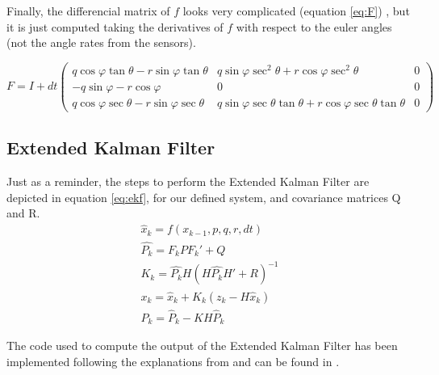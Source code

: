 Finally, the differencial matrix of $f$ looks very complicated (equation \ref{eq:F}) , but it is just computed taking the derivatives of $f$ with respect to the euler angles (not the angle rates from the sensors).

\begin{equation}
    \label{eq:F}
   F = I + dt
   \begin{pmatrix}
       q \cos\varphi \tan\theta - r \sin\varphi \tan \theta &
       q \sin \varphi \sec^2 \theta + r \cos \varphi \sec^2 \theta &
       0 \\
       -q \sin \varphi - r \cos \varphi
       & 0 & 0 \\
       q \cos \varphi \sec \theta - r \sin \varphi \sec \theta &
       q \sin \varphi \sec \theta \tan \theta + r \cos\varphi \sec \theta \tan  \theta &
       0
   \end{pmatrix}
\end{equation}


\subsection{Extended Kalman Filter}
Just as a reminder, the steps to perform the Extended Kalman Filter are depicted in equation \ref{eq:ekf}, for our defined system, and covariance matrices Q and R.
\begin{equation}
\label{eq:ekf}
\begin{array}{c}
    \hat{x}_k = f(x_{k-1},p,q,r,dt) \\
    \hat{P_k} = F_k P F_k' + Q \\
    K_k = \hat{P_k} H \left(H \hat{P_k} H' + R\right)^{-1} \\
    x_k = \hat{x}_k + K_k \left(z_k - H \hat{x}_k \right) \\
    P_k = \hat{P}_k - K H \hat{P}_k 
\end{array}
\end{equation}

The code used to compute the output of the Extended Kalman Filter has been implemented following the explanations from \cite{kim2011kalman} and can be found in \cite{repo}.